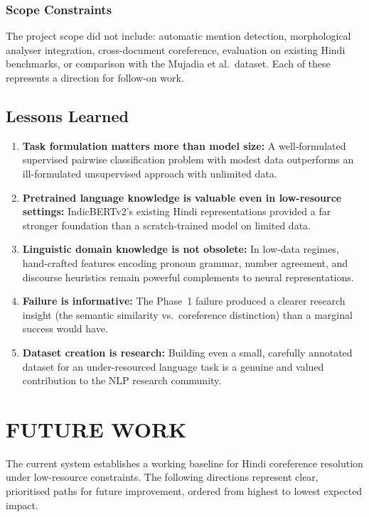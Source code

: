 \documentclass[12pt,a4paper]{report}
\begin{document}
\subsection{Scope Constraints}

The project scope did not include: automatic mention detection, morphological analyser integration, cross-document coreference, evaluation on existing Hindi benchmarks, or comparison with the Mujadia et al.\ dataset. Each of these represents a direction for follow-on work.

\section{Lessons Learned}

\begin{enumerate}
    \item \textbf{Task formulation matters more than model size:} A well-formulated supervised pairwise classification problem with modest data outperforms an ill-formulated unsupervised approach with unlimited data.
    \item \textbf{Pretrained language knowledge is valuable even in low-resource settings:} IndicBERTv2's existing Hindi representations provided a far stronger foundation than a scratch-trained model on limited data.
    \item \textbf{Linguistic domain knowledge is not obsolete:} In low-data regimes, hand-crafted features encoding pronoun grammar, number agreement, and discourse heuristics remain powerful complements to neural representations.
    \item \textbf{Failure is informative:} The Phase~1 failure produced a clearer research insight (the semantic similarity vs.\ coreference distinction) than a marginal success would have.
    \item \textbf{Dataset creation is research:} Building even a small, carefully annotated dataset for an under-resourced language task is a genuine and valued contribution to the NLP research community.
\end{enumerate}


\chapter{FUTURE WORK}

The current system establishes a working baseline for Hindi coreference resolution under low-resource constraints. The following directions represent clear, prioritised paths for future improvement, ordered from highest to lowest expected impact.
\end{document}
